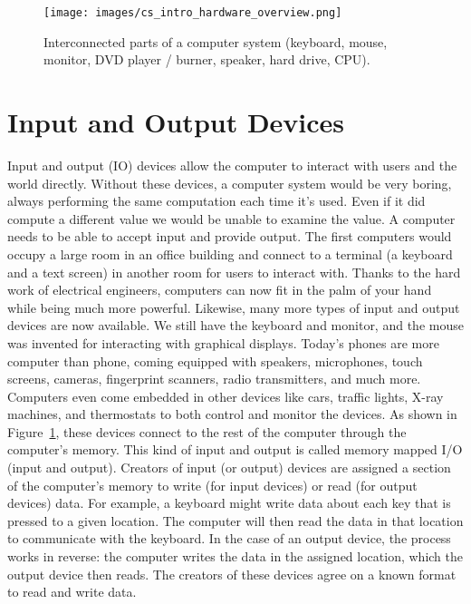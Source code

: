 \begin{figure}
	\centering
	\texttt{[image: images/cs\_intro\_hardware\_overview.png]}
	\caption{Interconnected parts of a computer system (keyboard, mouse,
                 monitor, DVD player / burner, speaker, hard drive, CPU).
                 }
	\label{fig:hardware:overview}
\end{figure}

\section{Input and Output Devices}

Input and output (IO) devices allow the computer to interact with users and the world
directly. Without these devices, a computer system would be very boring, always
performing the same computation each time it's used. Even if it did compute a
different value we would be unable to examine the value. A computer needs to be
able to accept input and provide output. The first computers would occupy a
large room in an office building and connect to a terminal (a keyboard and a
text screen) in another room for users to interact with. Thanks to the hard work
of electrical engineers,
computers can now fit in the palm of your hand while being much more powerful.
Likewise, many more types of input and output devices are now available. We
still have the keyboard and monitor, and the mouse was invented for interacting
with graphical displays. Today's phones are more computer than phone, coming
equipped with speakers, microphones, touch screens, cameras, fingerprint
scanners, radio transmitters, and much more. Computers even come embedded in
other devices like cars, traffic lights, X-ray machines, and thermostats to both
control and monitor the devices. As shown in Figure~\ref{fig:hardware:overview},
these devices connect to the rest of the computer through the computer's memory.
This kind of input and output is called memory mapped I/O (input and output).
Creators of input (or output) devices are assigned a section of the computer’s memory to write (for input devices) or read (for output devices) data. For example, a keyboard might write data about each key that is pressed to a given location. The computer will then read the data in that location to communicate with the keyboard. In the case of an output device, the process works in reverse: the computer writes the data in the assigned location, which the output device then reads. The creators of these devices agree on a known format to read and write data.

